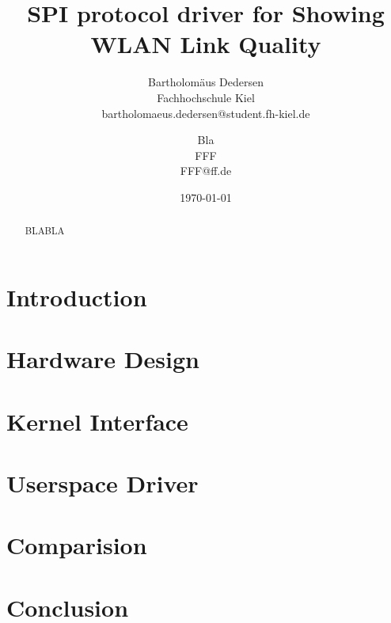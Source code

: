 \documentclass[bibtotocnumbered, headsepline,normalheadings]{report}
\begin{document}
\author{ 
Bartholomäus Dedersen \\ Fachhochschule Kiel \\ bartholomaeus.dedersen@student.fh-kiel.de \and
Bla \\ FFF \\ FFF@ff.de}

\date{\today} 
\title{SPI protocol driver for Showing WLAN Link Quality} 

\maketitle


\begin{abstract}

    BLABLA

\end{abstract}

\tableofcontents \newpage

\chapter{Introduction}



\chapter{Hardware Design}
\label{chap:hardware}



\chapter{Kernel Interface}
\label{chap:kernel}


\chapter{Userspace Driver}
\label{chap:userspace}


\chapter{Comparision}
\label{chap:comparision}


\chapter{Conclusion}
\label{chap:conclusion}



\nocite{*}


\listoffigures
\begingroup \let\clearpage\relax
\listoftables \endgroup

\end{document}
